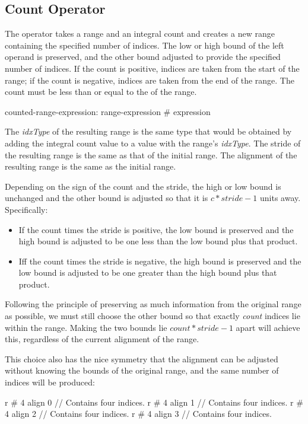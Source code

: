 \subsection{Count Operator}
\label{Count_Operator}

The \chpl{#} operator takes a range and an integral count and creates a new
range containing the specified number of indices.  The low or high bound of the
left operand is preserved, and the other bound adjusted to provide the specified
number of indices.  If the count is positive, indices are taken from the start
of the range; if the count is negative, indices are taken from the end of the
range.  The count must be less than or equal to the  of the range.

\begin{syntax}
counted-range-expression:
  range-expression # expression
\end{syntax}

The \emph{idxType} of the resulting range is the same type that would be
obtained by adding the integral count value to a value with the
range's \emph{idxType}.  The stride of the resulting range is the same as that
of the initial range.  The alignment of the resulting range is the same as the
initial range.

Depending on the sign of the count and the stride, the high or low bound is
unchanged and the other bound is adjusted so that it is $c * stride - 1$ units
away.  Specifically:
\begin{itemize}
\item If the count times the stride is positive, the low bound is preserved
and the high bound is adjusted to be one less than the low bound plus that
product.
\item Iff the count times the stride is negative, the high bound is preserved
and the low bound is adjusted to be one greater than the high bound plus that
product.
\end{itemize}

\begin{rationale}
Following the principle of preserving as much information from the original
range as possible, we must still choose the other bound so that
exactly \emph{count} indices lie within the range.  Making the two bounds lie
$count * stride - 1$ apart will achieve this, regardless of the current
alignment of the range.

This choice also has the nice symmetry that the alignment can be adjusted
without knowing the bounds of the original range, and the same number of indices
will be produced:
\begin{chapel}
r # 4 align 0   // Contains four indices.
r # 4 align 1   // Contains four indices.
r # 4 align 2   // Contains four indices.
r # 4 align 3   // Contains four indices.
\end{chapel}
\end{rationale}

